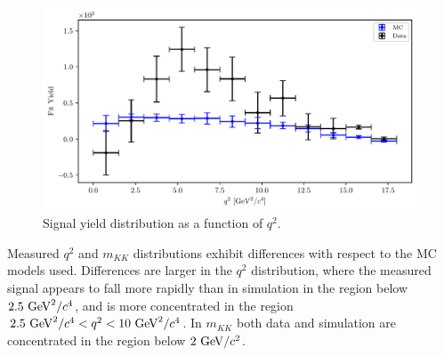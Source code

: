 \begin{figure}[H]
	\centering
	\captionsetup{width=0.8\linewidth}
	\includegraphics[width=\linewidth]{fig/sig_q2_all}
	\caption{Signal yield distribution as a function of $q^2$.}
	\label{fig:q2_windows}
\end{figure} 

Measured $q^2$ and $m_{KK}$ distributions exhibit differences with respect to the MC models used. Differences are larger in the $q^2$ distribution, where the measured signal appears to fall more rapidly than in simulation in the region below $2.5\mathrm{~GeV}^2/c^4$, and is more concentrated in the region $2.5\mathrm{~GeV}^2/c^4 < q^2 < 10\mathrm{~GeV}^2/c^4$. In $m_{KK}$ both data and simulation are concentrated in the region below $2\mathrm{~GeV}/c^2$.